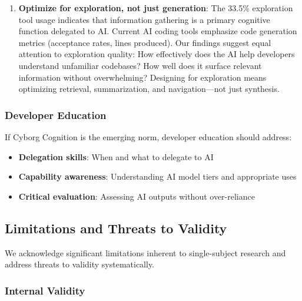 \begin{enumerate}
    \item \textbf{Optimize for exploration, not just generation}: The 33.5\% exploration tool usage indicates that information gathering is a primary cognitive function delegated to AI. Current AI coding tools emphasize code generation metrics (acceptance rates, lines produced). Our findings suggest equal attention to exploration quality: How effectively does the AI help developers understand unfamiliar codebases? How well does it surface relevant information without overwhelming? Designing for exploration means optimizing retrieval, summarization, and navigation---not just synthesis.
\end{enumerate}

\subsubsection{Developer Education}

If Cyborg Cognition is the emerging norm, developer education should address:
\begin{itemize}
    \item \textbf{Delegation skills}: When and what to delegate to AI
    \item \textbf{Capability awareness}: Understanding AI model tiers and appropriate uses
    \item \textbf{Critical evaluation}: Assessing AI outputs without over-reliance
\end{itemize}

\subsection{Limitations and Threats to Validity}

We acknowledge significant limitations inherent to single-subject research and address threats to validity systematically.

\subsubsection{Internal Validity}

